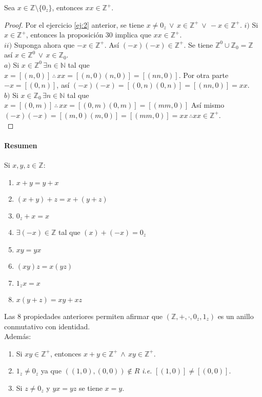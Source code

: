 \begin{proposition}\label{prop:36}
  Sea $x \in \mathbb{Z} \setminus \{0_z\}$, entonces $xx \in \mathbb{Z}^+$.
\end{proposition}
\begin{proof} Por el ejercicio \ref{ej:2} anterior, se tiene $x \neq 0_z \,\lor
  \, x\in \mathbb{Z}^+ \, \lor \, -x \in \mathbb{Z}^+$.
  $i)$ Si $x \in \mathbb{Z}^+$, entonces la proposición 30 implica que $xx \in
  \mathbb{Z}^+$. \\
  $ii)$ Suponga ahora que $-x \in \mathbb{Z}^+$. Así $(-x)(-x) \in
  \mathbb{Z}^+$. Se tiene $\mathbb{Z}^0 \cup \mathbb{Z}_0 = \mathbb{Z}$ así $x
  \in \mathbb{Z}^0 \, \lor \, x \in \mathbb{Z}_0$. \\
  $a)$ Si $x \in \mathbb{Z}^0 \, \exists n \in \mathbb{N}$ tal que $x =
  [(n,0)] \, \therefore \, xx = [(n,0)(n,0)] = [(nn, 0)]$. Por otra parte $-x
  = [(0,n)]$, así $(-x)(-x) = [(0,n)(0,n)] = [(nn,0)] = xx$. \\
  $b)$ Si $x \in \mathbb{Z}_0 \, \exists n \in \mathbb{N}$ tal que $x =
  [(0,m)] \, \therefore \, xx = [(0,m)(0,m)] = [(mm,0)]$ Así mismo $(-x)(-x)=
  [(m,0)(m,0)] = [(mm,0)] = xx \, \therefore xx\in \mathbb{Z}^+$. \\
\end{proof}
\paragraph{Resumen}
Si $x,y,z \in \mathbb{Z}$:\\
\begin{enumerate}
  \item $x +y = y +x$
  \item $(x +y) + z = x + (y +z)$
  \item $0_z + x = x$
  \item $ \exists (-x) \in \mathbb{Z}$ tal que $(x)+ (-x) = 0_z$
  \item $xy = yx$
  \item $(xy)z = x(yz)$
  \item $1_z x =x$
  \item $x(y+z) = xy + xz$
\end{enumerate}
Las 8 propiedades anteriores permiten afirmar que $(\mathbb{Z}, +, \cdot, 0_z,
1_z)$ es un anillo conmutativo con identidad. \\
Además:
\begin{enumerate}
  \item Si $xy \in \mathbb{Z}^+$, entonces $x + y \in \mathbb{Z}^+ \, \land \,
    xy \in \mathbb{Z}^+$.
  \item $1_z \neq 0_z$ ya que $((1,0), (0,0))\notin R$ \textit{i.e.} $[(1,0)]
    \neq [(0,0)]$.
  \item Si $z \neq 0_z $ y $yx = yz$ se tiene $x = y$.
\end{enumerate}
